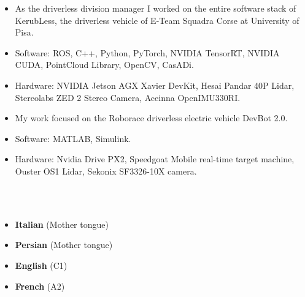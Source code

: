







\begin{itemize}
\item As the driverless division manager I worked on the entire software stack of KerubLess, the driverless vehicle of E-Team Squadra Corse at University of Pisa.
\item Software: ROS, C++, Python, PyTorch, NVIDIA TensorRT, NVIDIA CUDA, PointCloud Library, OpenCV, CasADi.
\item Hardware: NVIDIA Jetson AGX Xavier DevKit, Hesai Pandar 40P Lidar, Stereolabs ZED 2 Stereo Camera, Aceinna OpenIMU330RI.
\end{itemize}
\smallskip
\smallskip
\smallskip
{}
\begin{itemize}
\item My work focused on the Roborace driverless electric vehicle DevBot 2.0.
\item Software: MATLAB, Simulink.
\item Hardware: Nvidia Drive PX2, Speedgoat Mobile real-time target machine, Ouster OS1 Lidar, Sekonix SF3326-10X camera.
\end{itemize}

\\
\smallskip
\smallskip
\smallskip
{}\\
\smallskip
\smallskip
\smallskip
{}

\begin{itemize}
  \item \textbf{Italian} (Mother tongue)
  \item \textbf{Persian} (Mother tongue)
  \item \textbf{English} (C1)
  \item \textbf{French} (A2)
\end{itemize}